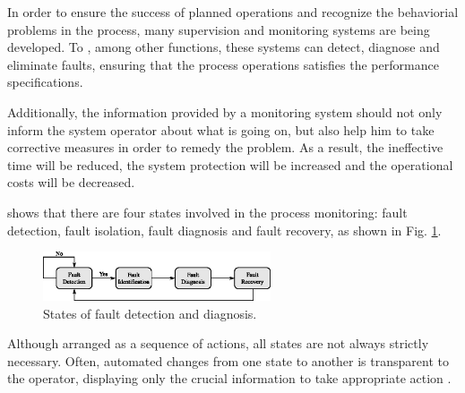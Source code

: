 \documentclass[10pt,fleqn,a4paper]{article}
\begin{document}
In order to ensure the success of planned operations and recognize the
behaviorial problems in the process, many supervision and monitoring systems are
being developed. To \citet{chiang:2001}, among other functions, these systems
can detect, diagnose and eliminate faults, ensuring that the process operations
satisfies the performance specifications.

Additionally, the information provided by a monitoring system should not only
inform the system operator about what is going on, but also help him to take
corrective measures in order to remedy the problem. As a result, the ineffective
time will be reduced, the system protection will be increased and the
operational costs will be decreased.

\citet{chiang:2001} shows that there are four states involved in the process
monitoring: fault detection, fault isolation, fault diagnosis and fault
recovery, as shown in Fig. \ref{fig:states}.

\begin{figure}[htb]
\centering
    \includegraphics[width=0.6\textwidth]{imgs/states}
    \caption{States of fault detection and diagnosis.}
    \label{fig:states}
\end{figure}

Although arranged as a sequence of actions, all states are not always strictly
necessary. Often, automated changes from one state to another is transparent to
the operator, displaying only the crucial information to take appropriate action
\citep{chiang:2001}.
\end{document}
